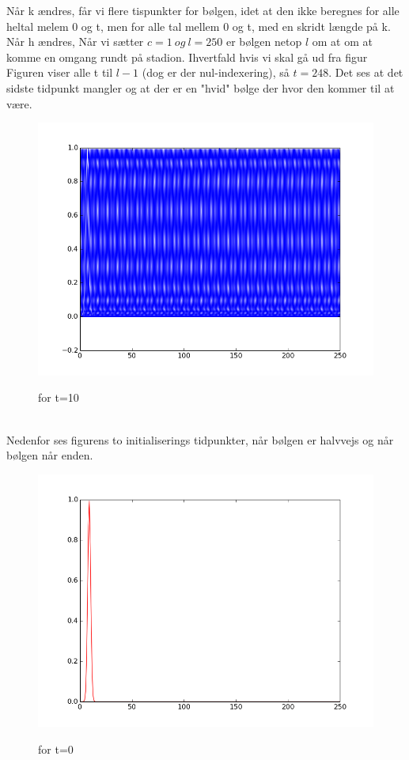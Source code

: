 \documentclass[12pt, a4paper]{article}
\begin{document}
Når k ændres, får vi flere tispunkter for bølgen, idet at den ikke beregnes for alle heltal melem 0 og t, men for alle tal mellem 0 og t, med en skridt længde på k.\\
Når h ændres, 
Når vi sætter $c=1\ og\ l=250$ er bølgen netop $l$ om at om at komme en omgang rundt på stadion. Ihvertfald hvis vi skal gå ud fra figur\\
Figuren viser alle t til $l-1$ (dog er der nul-indexering), så $t=248$. Det ses at det sidste tidpunkt mangler og at der er en "hvid" bølge der hvor den kommer til at være.\\
\begin{figure}[h!]
	\centering
	\includegraphics[scale=0.5]{die_welle6.png}\\
	\caption{for t=10}
\end{figure}\\
Nedenfor ses figurens to initialiserings tidpunkter, når bølgen er halvvejs og når bølgen når enden.
\begin{figure}[h!]
	\centering
	\includegraphics[scale=0.5]{die_welle8.png}\\
	\caption{for t=0}
\end{figure}\\
\end{document}
